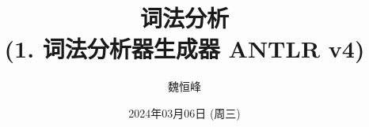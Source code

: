 \documentclass[]{beamer}
\title[词法分析]{词法分析 \\ (1. 词法分析器生成器 ANTLR v4)}
\author[魏恒峰]{\large 魏恒峰}
\institute{hfwei@nju.edu.cn}
\date{2024年03月06日 (周三)}
\begin{document}
\maketitle



\thankyou{}

\end{document}

